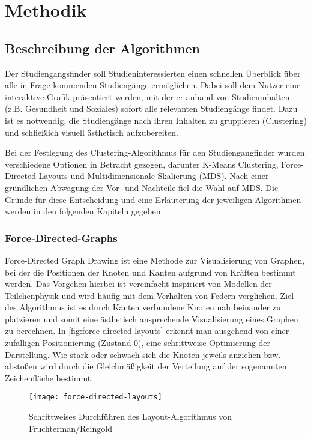 \section{Methodik}
\subsection{Beschreibung der Algorithmen}
Der Studiengangsfinder soll Studieninteressierten einen schnellen Überblick über
alle in Frage kommenden Studiengänge ermöglichen.  Dabei soll dem Nutzer eine
interaktive Grafik präsentiert werden, mit der er anhand von Studieninhalten
(z.B. \glqq Gesundheit und Soziales\grqq{}) sofort alle relevanten Studiengänge
findet. Dazu ist es notwendig, die Studiengänge nach ihren Inhalten zu
gruppieren (Clustering) und schließlich visuell ästhetisch aufzubereiten.

Bei der Festlegung des Clustering-Algorithmus für den Studiengangfinder wurden
verschiedene Optionen in Betracht gezogen, darunter K-Means Clustering,
Force-Directed Layouts und Multidimensionale Skalierung (MDS). Nach einer
gründlichen Abwägung der Vor- und Nachteile fiel die Wahl auf MDS. Die Gründe
für diese Entscheidung und eine Erläuterung der jeweiligen Algorithmen werden in
den folgenden Kapiteln gegeben.

\subsubsection{Force-Directed-Graphs}
Force-Directed Graph Drawing ist eine Methode zur Visualisierung von Graphen,
bei der die Positionen der Knoten und Kanten aufgrund von Kräften bestimmt
werden. Das Vorgehen hierbei ist vereinfacht inspiriert von Modellen der
Teilchenphysik und wird häufig mit dem Verhalten von Federn verglichen. Ziel des
Algorithmus ist es durch Kanten verbundene Knoten nah beinander zu platzieren
und somit eine ästhetisch ansprechende Visualisierung eines Graphen zu
berechnen. In \autoref{fig:force-directed-layouts} erkennt man ausgehend von
einer zufälligen Positionierung (Zustand 0), eine schrittweise Optimierung der
Darstellung. Wie stark oder schwach sich die Knoten jeweils
\glqq anziehen\grqq{} bzw. \glqq abstoßen\grqq{} wird durch die Gleichmäßigkeit
der Verteilung auf der sogenannten Zeichenfläche bestimmt.
\parencite{force-directed-layouts}

\begin{figure}[H]
    \centering
    \texttt{[image: force-directed-layouts]}
    \caption{Schrittweises Durchführen des Layout-Algorithmus von Fruchterman/Reingold}
    \label{fig:force-directed-layouts}
\end{figure}

